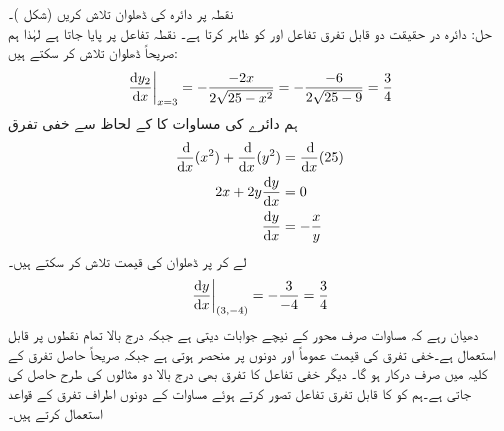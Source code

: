 نقطہ  پر دائرہ  کی ڈھلوان تلاش کریں (شکل )۔\\
حل:\quad
دائرہ در حقیقت دو قابل تفرق تفاعل  اور  کو ظاہر کرتا ہے۔ نقطہ  تفاعل  پر پایا جاتا ہے لہٰذا ہم صریحاً ڈھلوان تلاش کر سکتے ہیں:
\begin{align}\label{مساوات_تفرق_دائرہ_نچلا}
\left. \frac{\dif y_2}{\dif x}\right|_{x=3}=-\frac{-2x}{2\sqrt{25-x^2}}=-\frac{-6}{2\sqrt{25-9}}=\frac{3}{4}
\end{align}
ہم دائرے کی مساوات کا  کے لحاظ سے خفی تفرق
\begin{align*}
\frac{\dif}{\dif x}(x^2)+\frac{\dif }{\dif x}(y^2)&=\frac{\dif}{\dif x}(25)\\
2x+2y\frac{\dif y}{\dif x}&=0\\
\frac{\dif y}{\dif x}&=-\frac{x}{y}
\end{align*}
لے کر  پر ڈھلوان کی قیمت تلاش کر سکتے ہیں۔
\begin{align*}
\left. \frac{\dif y}{\dif x}\right|_{(3,-4)}=-\frac{3}{-4}=\frac{3}{4}
\end{align*}
دھیان رہے کہ مساوات  صرف  محور کے نیچے جوابات دیتی ہے جبکہ درج بالا تمام نقطوں پر قابل استعمال ہے۔خفی تفرق کی قیمت عموماً  اور  دونوں پر منحصر ہوتی ہے جبکہ صریحاً حاصل تفرق کے کلیہ میں صرف  درکار ہو گا۔
دیگر خفی تفاعل کا تفرق بھی درج بالا دو مثالوں کی طرح حاصل کی جاتی ہے۔ہم  کو  کا قابل تفرق تفاعل تصور کرتے ہوئے مساوات کے دونوں اطراف تفرق کے قواعد استعمال کرتے ہیں۔

